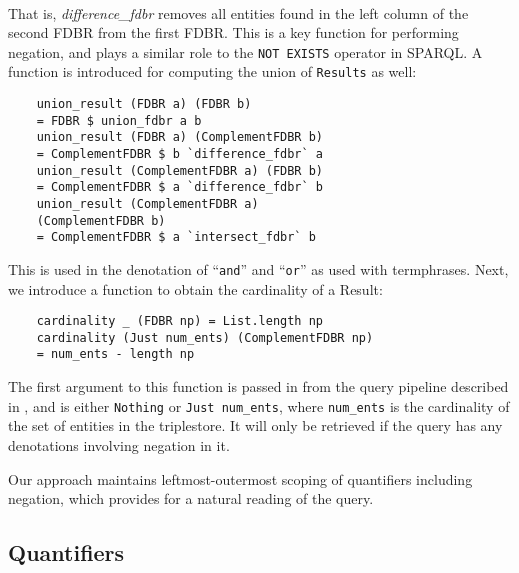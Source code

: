 \documentclass[../main.tex]{subfiles}
\begin{document}
\begin{refsection}
\begin{multline*}
\end{multline*}
That is, \textit{difference\_fdbr} removes all entities found in the left column of the second FDBR from the first FDBR.  This is a key function for performing negation, and plays a similar role to the \texttt{NOT EXISTS} operator in SPARQL.  A function is introduced for computing the union of \texttt{Results} as well:
\begin{small}
	\begin{verbatim}
    union_result (FDBR a) (FDBR b)
    = FDBR $ union_fdbr a b
    union_result (FDBR a) (ComplementFDBR b)
    = ComplementFDBR $ b `difference_fdbr` a
    union_result (ComplementFDBR a) (FDBR b)
    = ComplementFDBR $ a `difference_fdbr` b
    union_result (ComplementFDBR a)
    (ComplementFDBR b)
    = ComplementFDBR $ a `intersect_fdbr` b
	\end{verbatim}
\end{small}
This is used in the denotation of ``\texttt{and}'' and ``\texttt{or}'' as used with termphrases.
Next, we introduce a function to obtain the cardinality of a Result:
\begin{small}
	\begin{verbatim}
    cardinality _ (FDBR np) = List.length np
    cardinality (Just num_ents) (ComplementFDBR np)
    = num_ents - length np
	\end{verbatim}
\end{small}

The first argument to this function is passed in from the query pipeline described in \cite{peelar2020webistjournal}, and is either \texttt{Nothing} or \texttt{Just num\_ents}, where
\texttt{num\_ents} is the cardinality of the set of entities in the triplestore.  It will only be retrieved if the query has any denotations involving negation in it.

Our approach maintains leftmost-outermost scoping of quantifiers including negation, which provides for a natural reading of the query.

\subsection{Quantifiers}
\label{subsec:quantifiers}


\end{refsection}
\end{document}
